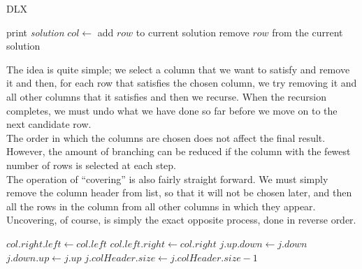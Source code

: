 \documentclass[12pt]{article}
\newcounter{row}
\newcounter{col}
\begin{document}
\begin{algorithm}[H]
\caption{DLX}\label{search}
\begin{algorithmic}[1]
\State print \textit{solution}
\State \Return
\EndIf
\State $col \gets$ 
\State {}
\State add $row$ to current solution
\State {}
\EndFor
\State {}
\State {}
\EndFor
\State remove $row$ from the current solution
\EndFor
\State {}
\EndProcedure
\end{algorithmic}
\end{algorithm}


The idea is quite simple; we select a column that we want to satisfy and remove it and then, for each row that satisfies the chosen column, we try removing it and all other columns that it satisfies and then we recurse. When the recursion completes, we must undo what we have done so far before we move on to the next candidate row. \\ 

The order in which the columns are chosen does not affect the final result. However, the amount of branching can be reduced if the column with the fewest number of rows is selected at each step. \\

The operation of ``covering'' is also fairly straight forward. We must simply remove the column header from list, so that it will not be chosen later, and then all the rows in the column from all other columns in which they appear. Uncovering, of course, is simply the exact opposite process, done in reverse order. \\

\begin{algorithm}[!ht]
\label{cover}
\begin{algorithmic}
\State $col.right.left \gets col.left$
\State $col.left.right \gets col.right$
\State $j.up.down \gets j.down$
\State $j.down.up \gets j.up$
\State $j.colHeader.size \gets j.colHeader.size - 1$
\EndFor
\EndFor
\EndProcedure
\end{algorithmic}
\end{algorithm}
\end{document}
